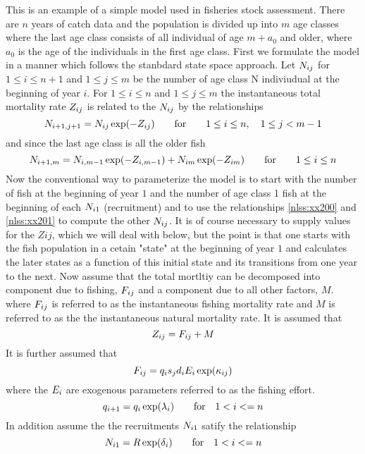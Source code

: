 This is an example of a simple model used in fisheries
stock assessment. There are $n$ years of catch data and the 
population is divided up into $m$ age classes where the last age 
class consists of all individual of age $m+a_0$ and older, 
where $a_0$ is the age of the
individuals in the first age class.
First we formulate the model in a manner which follows the 
stanbdard state space approach. 
Let $N_{ij}$ for $1\le i\le n+1$ and $1\le j\le m$ be the number of age class 
N indiviudual at the beginning of year $i$. 
For $1\le i\le n$ and $1\le j\le m$ the instantaneous total mortality rate
$Z_{ij}$ is related to the $N_{ij}$ by the relationships
\begin{equation}
 {
   N_{i+1,j+1}=N_{ij}\exp(-Z_{ij}) \qquad \hbox{for}\qquad 1\le i\le n,\quad 1\le j<m-1}
    \label{nlss:xx200}
\end{equation}
and since the last age class is all the older fish
\begin{equation}
 {
   N_{i+1,m}= N_{i,m-1}\exp(-Z_{i,m-1})+ N_{im}\exp(-Z_{im})\qquad \hbox{for}\qquad 1\le i\le n}
    \label{nlss:xx201}
\end{equation}
Now the conventional way to parameterize the model is to start with
the number of fish at the beginning of year $1$ 
and the number of age class 1 fish at the beginning of each
$N_{i1}$ (recruitment) 
and to use the 
relationships \ref{nlss:xx200} and \ref{nlss:xx201} to compute
the other $N_{ij}$. 
It is of course necessary to supply values for the $Zij$, which we will deal 
with below, but the point is that one
starts with the fish population in a cetain "state" at the beginning of year
$1$ and calculates the later states as a function of this initial state and
its transitions from one year to the next. Now assume that
the total mortltiy can be decomposed into   component due to fishing, $F_{ij}$
and a component due to all other factors, $M$. 
where $F_{ij}$ is referred to as 
the instantaneous fishing mortality rate
and $M$ is referred to as the
the instantaneous natural mortality rate.
It is assumed that
\begin{equation}
 {
   Z_{ij}=F_{ij}+M 
   }
    \label{nlss:xx202}
\end{equation}
It is further assumed that
\begin{equation}
 {
   F_{ij}= q_is_jd_iE_i\exp(\kappa_{ij}) 
   }
    \label{nlss:xx203}
\end{equation}
where the $E_i$ are exogenous parameters referred to as the fishing effort.
\begin{equation}
 {
   q_{i+1}=q_i\exp(\lambda_i) \qquad \hbox{for} \quad 1<i<=n
  }
    \label{nlss:xx204}
\end{equation}
In addition assume the the recruitments $N_{i1}$ satify the relationship 
\begin{equation}
 {
   N_{i1}=R\exp(\delta_i) \qquad \hbox{for} \quad 1<i<=n
  }
\end{equation}

